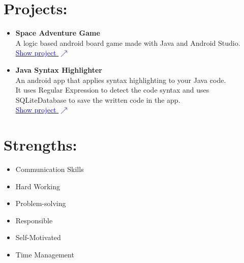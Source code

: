 \documentclass[a4paper, 11pt]{article}
\begin{document}
\begin{tcolorbox}
\begin{minipage}[t]{10cm}
\begin{tcolorbox}[grow to right by=0.5cm, colframe=white, colback=white]
                \section*{Projects:}
                    \begin{itemize}
                        \item {
                            \textbf{Space Adventure Game}\\
                            A logic based android board game made with Java and Android Studio.\\
                            \href{https://github.com/mouli-dutta/Space-Adventure-Game}{\textcolor{blue}{Show project $\nearrow$}}
                        }
                        \item {
                            \textbf{Java Syntax Highlighter}\\
                            An android app that applies syntax highlighting to your Java code.\\
                            It uses Regular Expression to detect the code syntax
                            and uses SQLiteDatabase to save the written code in the app.\\
                            \href{https://github.com/mouli-dutta/Java-Editor}{\textcolor{blue}{Show project $\nearrow$}}
                        }
                    \end{itemize}

                \section*{Strengths:}
                    \begin{itemize}
                        \item Communication Skills
                        \item Hard Working
                        \item Problem-solving
                        \item Responsible
                        \item Self-Motivated
                        \item Time Management
                    \end{itemize}
                
            \end{tcolorbox}
            
        \end{minipage}
    \end{tcolorbox}
\end{document}
